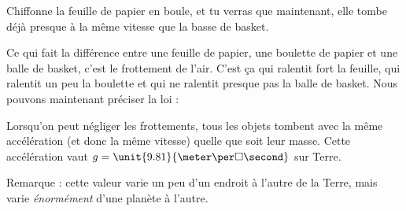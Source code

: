 Chiffonne la feuille de papier en boule, et tu verras que maintenant, elle tombe déjà presque à la même vitesse que la basse de basket.

Ce qui fait la différence entre une feuille de papier, une boulette de papier et une balle de basket, c'est le frottement de l'air. C'est ça qui ralentit fort la feuille, qui ralentit un peu la boulette et qui ne ralentit presque pas la balle de basket. Nous pouvons maintenant préciser la loi :
\begin{loiphyz}
Lorsqu'on peut négliger les frottements, tous les objets tombent avec la même accélération (et donc la même vitesse) quelle que soit leur masse. Cette accélération vaut $g=\unit{9.81}{\meter\per\square\second}$ sur Terre.
\end{loiphyz}
Remarque : cette valeur varie un peu d'un endroit à l'autre de la Terre, mais varie \emph{énormément} d'une planète à l'autre.

